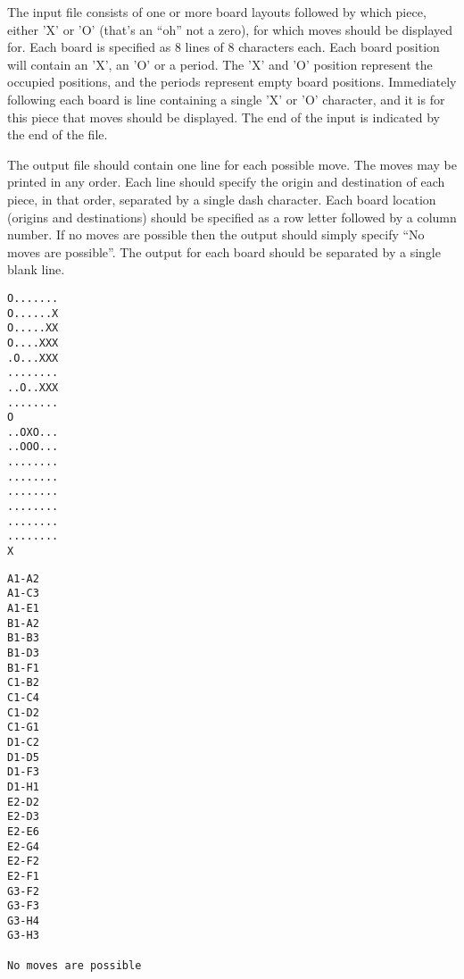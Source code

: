 \bigskip
{}

The input file consists of one or more board layouts followed by which
piece, either 'X' or 'O' (that's an ``oh'' not a zero), for which
moves should be displayed for.  Each board is specified as 8 lines of
8 characters each.  Each board position will contain an 'X', an 'O' or
a period.  The 'X' and 'O' position represent the occupied positions,
and the periods represent empty board positions.  Immediately
following each board is line containing a single 'X' or 'O' character,
and it is for this piece that moves should be displayed.  The end of
the input is indicated by the end of the file.

The output file should contain one line for each possible move.  The
moves may be printed in any order.  Each line should specify the
origin and destination of each piece, in that order, separated by a
single dash character.  Each board location (origins and destinations)
should be specified as a row letter followed by a column number.  If
no moves are possible then the output should simply specify ``No moves
are possible''.  The output for each board should be separated by a
single blank line.

\bigskip
{}

{\small
\begin{verbatim}
O.......
O......X
O.....XX
O....XXX
.O...XXX
........
..O..XXX
........
O
..OXO...
..OOO...
........
........
........
........
........
........
X
\end{verbatim}
}

\bigskip
{}

{\small
\begin{verbatim}
A1-A2
A1-C3
A1-E1
B1-A2
B1-B3
B1-D3
B1-F1
C1-B2
C1-C4
C1-D2
C1-G1
D1-C2
D1-D5
D1-F3
D1-H1
E2-D2
E2-D3
E2-E6
E2-G4
E2-F2
E2-F1
G3-F2
G3-F3
G3-H4
G3-H3

No moves are possible
\end{verbatim}
}



